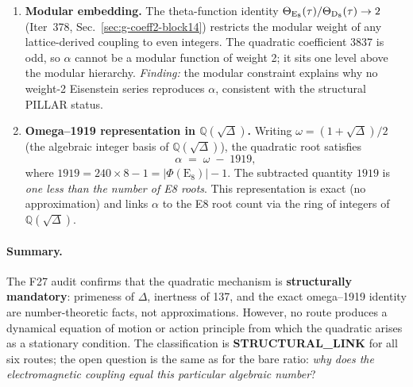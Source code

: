 \documentclass[aps,prd,twocolumn,superscriptaddress,floatfix,nofootinbib]{revtex4-2}
\theoremstyle{definition}
\theoremstyle{remark}
\begin{document}
\begin{enumerate}
  \item \textbf{Modular embedding.}
        The theta-function identity $\Theta_{\rm E_8}(\tau)/\Theta_{\rm D_8}(\tau) \to 2$
        (Iter~378, Sec.~\ref{sec:g-coeff2-block14}) restricts the modular weight of
        any lattice-derived coupling to even integers.  The quadratic coefficient 3837
        is odd, so $\alpha$ cannot be a modular function of weight 2; it sits one level
        above the modular hierarchy.  \textit{Finding:} the modular constraint explains
        why no weight-2 Eisenstein series reproduces $\alpha$, consistent with the
        structural PILLAR status.

  \item \textbf{Omega--1919 representation in $\mathbb{Q}(\sqrt{\Delta})$.}
        Writing $\omega = (1 + \sqrt{\Delta})/2$ (the algebraic integer basis of
        $\mathbb{Q}(\sqrt{\Delta})$), the quadratic root satisfies
        \begin{equation}
          \alpha \;=\; \omega \;-\; 1919,
        \end{equation}
        where $1919 = 240 \times 8 - 1 = |\Phi(\mathrm{E}_8)| - 1$.  The subtracted
        quantity $1919$ is \textit{one less than the number of E8 roots}.  This
        representation is exact (no approximation) and links $\alpha$ to the E8 root
        count via the ring of integers of $\mathbb{Q}(\sqrt{\Delta})$.
\end{enumerate}

\paragraph{Summary.}
The F27 audit confirms that the quadratic mechanism is \textbf{structurally mandatory}:
primeness of $\Delta$, inertness of 137, and the exact omega--1919 identity are
number-theoretic facts, not approximations.  However, no route produces a dynamical
equation of motion or action principle from which the quadratic arises as a stationary
condition.  The classification is \textbf{STRUCTURAL\_LINK} for all six routes; the
open question is the same as for the bare ratio: \textit{why does the electromagnetic
coupling equal this particular algebraic number}?
\end{document}
